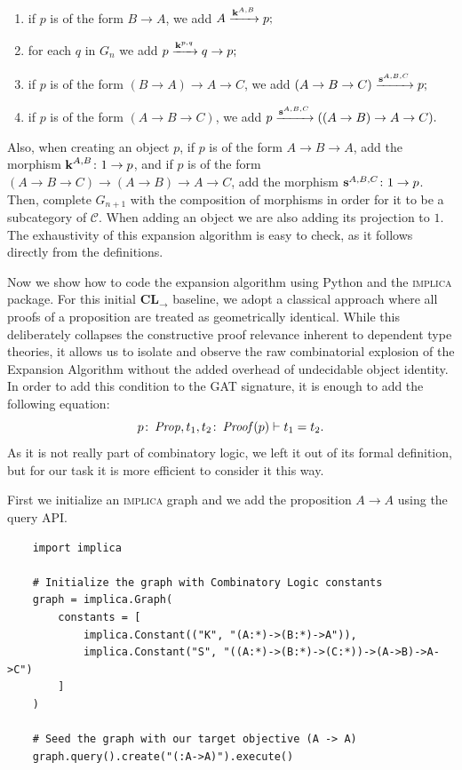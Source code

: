 \begin{enumerate}
    \item if $p$ is of the form $B \to A$, we add \(
        A \xrightarrow{\operatorname{\mathbf{k}}^{A, B}} p;
    \)
    \item for each $q$ in $G_n$ we add \(
        p \xrightarrow{\operatorname{\mathbf{k}}^{p, q}} q \to p;
    \)
    \item if $p$ is of the form $(B \to A) \to A \to C$, we add \(
        (A \to B \to C) \xrightarrow{\operatorname{\mathbf{s}}^{A, B, C}} p;
    \)
    \item if $p$ is of the form $(A \to B \to C)$, we add \(
        p \xrightarrow{\operatorname{\mathbf{s}}^{A, B, C}} ((A \to B) \to A \to C).
    \)
\end{enumerate}
Also, when creating an object $p$, if $p$ is of the form $A \to B \to A$, add the morphism $\operatorname{\mathbf{k}}^{A, B} \colon 1 \to p$, and if $p$ is of
the form $(A \to B \to C) \to (A \to B) \to A \to C$, add the morphism $\operatorname{\mathbf{s}}^{A, B, C} \colon 1 \to p$. Then, complete $G_{n+1}$ with the 
composition of morphisms in order for it to be a subcategory of $\mathcal{C}$.
When adding an object we are also adding its projection to $1$.
The exhaustivity of this expansion algorithm is easy to check, as it follows directly from the definitions.

Now we show how to code the expansion algorithm using Python and the \textsc{implica} package. 
For this initial $\textbf{CL}_{\rightarrow}$ baseline, we adopt a classical approach where all proofs 
of a proposition are treated as geometrically identical. While this deliberately collapses the constructive 
proof relevance inherent to dependent type theories, it allows us to isolate and observe the raw combinatorial 
explosion of the Expansion Algorithm without the added overhead of undecidable object identity. 
In order to add this condition to the GAT signature, it is enough to add the following equation:
\[
    p \colon \operatorname{\mathit{Prop}}, t_1, t_2 \colon \operatorname{\mathit{Proof}}(p) \vdash t_1 = t_2.
\]
As it is not really part of combinatory logic, we left it out of its formal definition, but for our task it is 
more efficient to consider it this way.

First we initialize an \textsc{implica} graph and we add the proposition $A \to A$ using the query API.
\begin{verbatim}
    import implica

    # Initialize the graph with Combinatory Logic constants
    graph = implica.Graph(
        constants = [
            implica.Constant(("K", "(A:*)->(B:*)->A")),
            implica.Constant("S", "((A:*)->(B:*)->(C:*))->(A->B)->A->C")
        ]
    )

    # Seed the graph with our target objective (A -> A)
    graph.query().create("(:A->A)").execute()
\end{verbatim}


